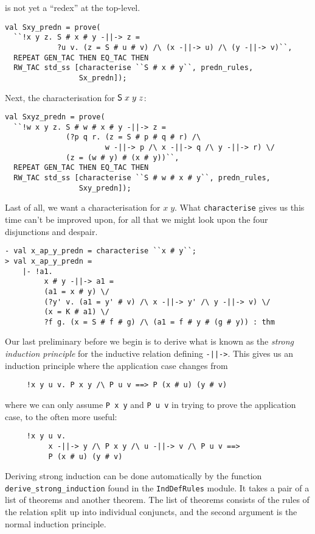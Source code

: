is not yet a ``redex'' at the top-level.
\begin{session}\begin{verbatim}
val Sxy_predn = prove(
  ``!x y z. S # x # y -||-> z =
            ?u v. (z = S # u # v) /\ (x -||-> u) /\ (y -||-> v)``,
  REPEAT GEN_TAC THEN EQ_TAC THEN
  RW_TAC std_ss [characterise ``S # x # y``, predn_rules,
                 Sx_predn]);
\end{verbatim}\end{session}
Next, the characterisation for ${\sf S}\;x\;y\;z$:
\begin{session}\begin{verbatim}
val Sxyz_predn = prove(
  ``!w x y z. S # w # x # y -||-> z =
              (?p q r. (z = S # p # q # r) /\
                       w -||-> p /\ x -||-> q /\ y -||-> r) \/
              (z = (w # y) # (x # y))``,
  REPEAT GEN_TAC THEN EQ_TAC THEN
  RW_TAC std_ss [characterise ``S # w # x # y``, predn_rules,
                 Sxy_predn]);
\end{verbatim}\end{session}
Last of all, we want a characterisation for $x\;y$.   What
\texttt{characterise} gives us this time can't be improved upon,
for all that we might look upon the four disjunctions and despair.
\begin{session}\begin{verbatim}
- val x_ap_y_predn = characterise ``x # y``;
> val x_ap_y_predn =
    |- !a1.
         x # y -||-> a1 =
         (a1 = x # y) \/
         (?y' v. (a1 = y' # v) /\ x -||-> y' /\ y -||-> v) \/
         (x = K # a1) \/
         ?f g. (x = S # f # g) /\ (a1 = f # y # (g # y)) : thm
\end{verbatim}\end{session}
Our last preliminary before we begin is to derive what is known as the
\emph{strong induction principle} for the inductive relation
defining \texttt{-||->}.  This gives us an induction principle where
the application case changes from
\begin{verbatim}
     !x y u v. P x y /\ P u v ==> P (x # u) (y # v)
\end{verbatim}
where we can only assume \texttt{P x y} and \texttt{P u v} in trying
to prove the application case, to the often more useful:
\begin{verbatim}
     !x y u v.
          x -||-> y /\ P x y /\ u -||-> v /\ P u v ==>
          P (x # u) (y # v)
\end{verbatim}
Deriving strong induction can be done automatically by the function\linebreak
\texttt{derive\_strong\_induction} found in the \texttt{IndDefRules}
module.  It takes a pair of a list of theorems and another theorem.
The list of theorems consists of the rules of the relation split up
into individual conjuncts, and the second argument is the normal
induction principle.

